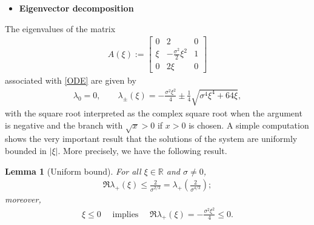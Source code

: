 \documentclass{article}
\def\R{\mathbb{R}}
\newtheorem{lemma}[theorem]{Lemma}
\begin{document}
\quad

\begin{itemize}
\item \textbf{Eigenvector decomposition}
\end{itemize}

The eigenvalues of the matrix
\begin{align}\label{matrix}
A(\xi):=
\begin{bmatrix}
0 & 2 & 0\\
\xi & -\frac{\sigma^2}{2}\xi^2 & 1\\
0 & 2\xi & 0
\end{bmatrix}
\end{align}
associated with \eqref{ODE} are given by
\begin{align}\label{eq:eigs}
\lambda_0=0,\qquad
\lambda_\pm(\xi)=
-\frac{\sigma^2\xi^2}{4}
\pm
\frac14\sqrt{\sigma^4\xi^4+64\xi},
\end{align}
with the square root interpreted as the complex square root when the
argument is negative and the branch with $ \sqrt{x}>0 $ if $ x>0 $ is chosen.
A simple computation shows the very important result that the solutions of the system are uniformly bounded in $ |\xi| $. More precisely, we have the following result.

\begin{lemma}[Uniform bound]\label{lem:lambdaBound}
	For all $\xi\in\R$ and $\sigma\neq 0$,
	\begin{align*}
		\Re \lambda_+(\xi)\le \frac{2}{\sigma^{2/3}}= \lambda_+\left(\frac{2}{\sigma^{4/3}}\right);
	\end{align*}
	moreover,
	\begin{align*}
		\xi\le 0 \quad\mbox{ implies }\quad \Re \lambda_+(\xi)= -\frac{\sigma^2\xi^2}{4}\le 0.
	\end{align*}
\end{lemma}
\end{document}
